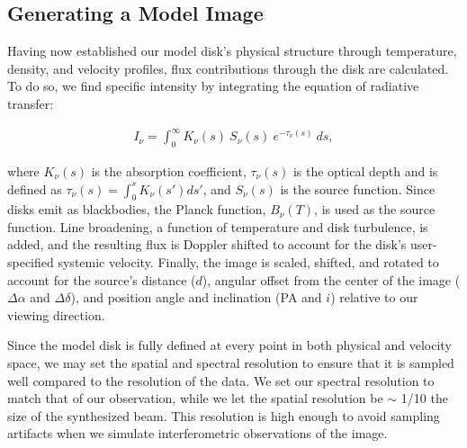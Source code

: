 




\subsection{Generating a Model Image}

Having now established our model disk's physical structure through temperature, density, and velocity profiles, flux contributions through the disk are calculated. To do so, we find specific intensity by integrating the equation of radiative transfer:

\begin{align}
  I_\nu = \int_0^{\infty} K_\nu(s)\ S_\nu(s)\ e^{-\tau_\nu(s)}\ ds,
\end{align}

where $K_\nu(s)$ is the absorption coefficient, $\tau_\nu(s)$ is the optical depth and is defined as $\tau_\nu(s) = \int_0^s K_\nu(s') ds'$, and $S_\nu(s)$ is the source function. Since disks emit as blackbodies, the Planck function, $B_\nu(T)$, is used as the source function. Line broadening, a function of temperature and disk turbulence, is added, and the resulting flux is Doppler shifted to account for the disk's user-specified systemic velocity. Finally, the image is scaled, shifted, and rotated to account for the source's distance ($d$), angular offset from the center of the image ($\Delta \alpha$ and $\Delta \delta$), and position angle and inclination (PA and $i$) relative to our viewing direction.

Since the model disk is fully defined at every point in both physical and velocity space, we may set the spatial and spectral resolution to ensure that it is sampled well compared to the resolution of the data. We set our spectral resolution to match that of our observation, while we let the spatial resolution be $\sim$ 1/10 the size of the synthesized beam. This resolution is high enough to avoid sampling artifacts when we simulate interferometric observations of the image.

